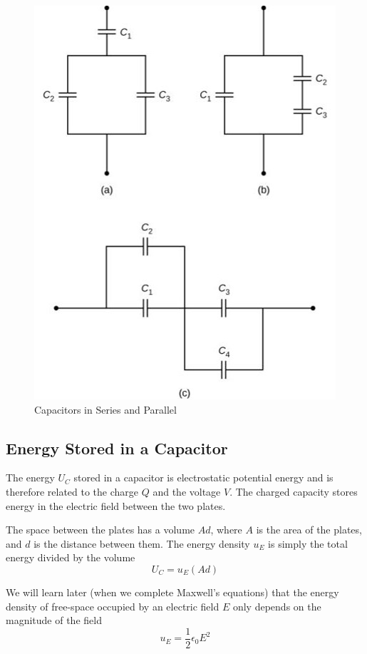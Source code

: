 \documentclass[14pt]{memoir}
\begin{document}
\begin{figure}[H]
\begin{center}
\includegraphics[scale=0.50]{fig/fig_08_15.jpg}
\caption{Capacitors in Series and Parallel}
\label{fig:08_15}
\end{center}
\end{figure}

\subsection{Energy Stored in a Capacitor}

The energy $U_{C}$ stored in a capacitor is electrostatic potential energy and is therefore related to the charge $Q$ and the voltage $V$. The charged capacity stores energy in the electric field between the two plates. 

The space between the plates has a volume $Ad$, where $A$ is the area of the plates, and $d$ is the distance between them. The energy density $u_E$ is simply the total energy divided by the volume
\begin{equation}
U_C = u_E (Ad)
\end{equation}

We will learn later (when we complete Maxwell's equations) that the energy density of free-space occupied by an electric field $E$ only depends on the magnitude of the field
\begin{equation}
u_E = \frac{1}{2} \epsilon_0 E^2
\end{equation}
\end{document}
